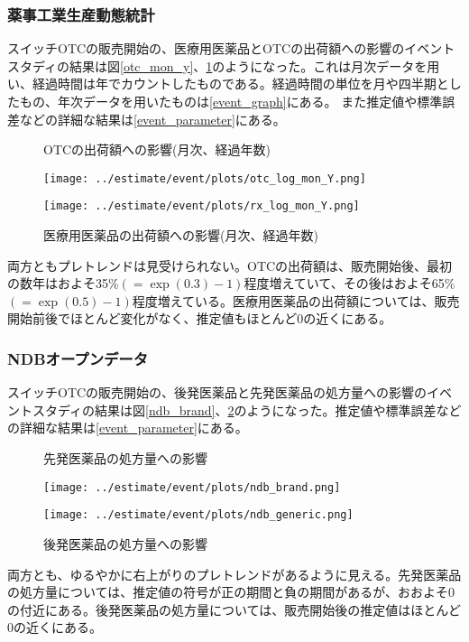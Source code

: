 \documentclass[a4paper,11pt,uplatex]{jsarticle}
\theoremstyle{definition}
\begin{document}
\subsubsection{薬事工業生産動態統計}
スイッチOTCの販売開始の、医療用医薬品とOTCの出荷額への影響のイベントスタディの結果は図\ref{otc_mon_y}、\ref{rx_mon_y}のようになった。これは月次データを用い、経過時間は年でカウントしたものである。経過時間の単位を月や四半期としたもの、年次データを用いたものは\ref{event_graph}にある。
また推定値や標準誤差などの詳細な結果は\ref{event_parameter}にある。 
\begin{figure}[H]
    \centering
    \begin{minipage}{0.45\textwidth}
        \caption{OTCの出荷額への影響(月次、経過年数)}\label{otc_mon_y}
        \centering
        \texttt{[image: ../estimate/event/plots/otc\_log\_mon\_Y.png]}
    \end{minipage}\hfill
    \begin{minipage}{0.45\textwidth}
        \caption{医療用医薬品の出荷額への影響(月次、経過年数)}\label{rx_mon_y}
        \centering
        \texttt{[image: ../estimate/event/plots/rx\_log\_mon\_Y.png]}
    \end{minipage}
\end{figure}
両方ともプレトレンドは見受けられない。OTCの出荷額は、販売開始後、最初の数年はおよそ35\%\((=\exp(0.3)-1)\)程度増えていて、その後はおよそ65\%\((=\exp(0.5)-1)\)程度増えている。医療用医薬品の出荷額については、販売開始前後でほとんど変化がなく、推定値もほとんど0の近くにある。
\subsubsection{NDBオープンデータ}
スイッチOTCの販売開始の、後発医薬品と先発医薬品の処方量への影響のイベントスタディの結果は図\ref{ndb_brand}、\ref{ndb_generic}のようになった。推定値や標準誤差などの詳細な結果は\ref{event_parameter}にある。
\begin{figure}[H]
    \centering
    \begin{minipage}{0.45\textwidth}
        \caption{先発医薬品の処方量への影響}\label{ndb_brand}
        \centering
        \texttt{[image: ../estimate/event/plots/ndb\_brand.png]}
    \end{minipage}\hfill
    \begin{minipage}{0.45\textwidth}
        \caption{後発医薬品の処方量への影響}\label{ndb_generic}
        \centering
        \texttt{[image: ../estimate/event/plots/ndb\_generic.png]}
    \end{minipage}
\end{figure}
両方とも、ゆるやかに右上がりのプレトレンドがあるように見える。先発医薬品の処方量については、推定値の符号が正の期間と負の期間があるが、おおよそ0の付近にある。後発医薬品の処方量については、販売開始後の推定値はほとんど0の近くにある。
\end{document}
